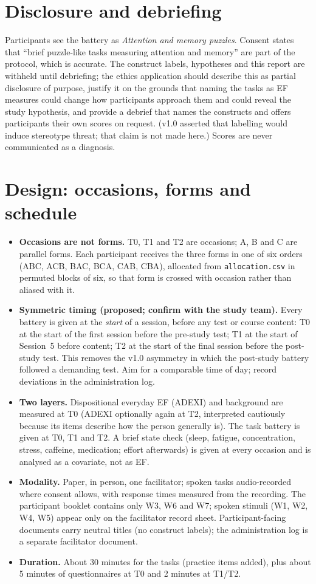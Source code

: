 \documentclass[11pt,a4paper]{article}
\begin{document}
\section*{Disclosure and debriefing}
Participants see the battery as \emph{Attention and memory puzzles}. Consent states that ``brief puzzle-like tasks measuring attention and memory'' are part of the protocol, which is accurate. The construct labels, hypotheses and this report are withheld until debriefing; the ethics application should describe this as partial disclosure of purpose, justify it on the grounds that naming the tasks as EF measures could change how participants approach them and could reveal the study hypothesis, and provide a debrief that names the constructs and offers participants their own scores on request. (v1.0 asserted that labelling would induce stereotype threat; that claim is not made here.) Scores are never communicated as a diagnosis.

\section{Design: occasions, forms and schedule}
\begin{itemize}
\item \textbf{Occasions are not forms.} T0, T1 and T2 are occasions; A, B and C are parallel forms. Each participant receives the three forms in one of six orders (ABC, ACB, BAC, BCA, CAB, CBA), allocated from \texttt{allocation.csv} in permuted blocks of six, so that form is crossed with occasion rather than aliased with it.
\item \textbf{Symmetric timing (proposed; confirm with the study team).} Every battery is given at the \emph{start} of a session, before any test or course content: T0 at the start of the first session before the pre-study test; T1 at the start of Session~5 before content; T2 at the start of the final session before the post-study test. This removes the v1.0 asymmetry in which the post-study battery followed a demanding test. Aim for a comparable time of day; record deviations in the administration log.
\item \textbf{Two layers.} Dispositional everyday EF (ADEXI) and background are measured at T0 (ADEXI optionally again at T2, interpreted cautiously because its items describe how the person generally is). The task battery is given at T0, T1 and T2. A brief state check (sleep, fatigue, concentration, stress, caffeine, medication; effort afterwards) is given at every occasion and is analysed as a covariate, not as EF.
\item \textbf{Modality.} Paper, in person, one facilitator; spoken tasks audio-recorded where consent allows, with response times measured from the recording. The participant booklet contains only W3, W6 and W7; spoken stimuli (W1, W2, W4, W5) appear only on the facilitator record sheet. Participant-facing documents carry neutral titles (no construct labels); the administration log is a separate facilitator document.
\item \textbf{Duration.} About 30 minutes for the tasks (practice items added), plus about 5 minutes of questionnaires at T0 and 2 minutes at T1/T2.
\end{itemize}
\end{document}
